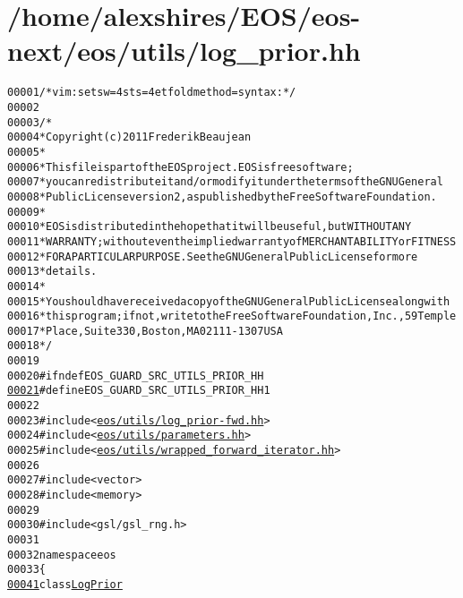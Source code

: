 \hypertarget{log__prior_8hh_source}{
\section{/home/alexshires/EOS/eos-\/next/eos/utils/log\_\-prior.hh}
}


\begin{footnotesize}\begin{alltt}
00001 \textcolor{comment}{/* vim: set sw=4 sts=4 et foldmethod=syntax : */}
00002 
00003 \textcolor{comment}{/*}
00004 \textcolor{comment}{ * Copyright (c) 2011 Frederik Beaujean}
00005 \textcolor{comment}{ *}
00006 \textcolor{comment}{ * This file is part of the EOS project. EOS is free software;}
00007 \textcolor{comment}{ * you can redistribute it and/or modify it under the terms of the GNU General}
00008 \textcolor{comment}{ * Public License version 2, as published by the Free Software Foundation.}
00009 \textcolor{comment}{ *}
00010 \textcolor{comment}{ * EOS is distributed in the hope that it will be useful, but WITHOUT ANY}
00011 \textcolor{comment}{ * WARRANTY; without even the implied warranty of MERCHANTABILITY or FITNESS}
00012 \textcolor{comment}{ * FOR A PARTICULAR PURPOSE.  See the GNU General Public License for more}
00013 \textcolor{comment}{ * details.}
00014 \textcolor{comment}{ *}
00015 \textcolor{comment}{ * You should have received a copy of the GNU General Public License along with}
00016 \textcolor{comment}{ * this program; if not, write to the Free Software Foundation, Inc., 59 Temple}
00017 \textcolor{comment}{ * Place, Suite 330, Boston, MA  02111-1307  USA}
00018 \textcolor{comment}{ */}
00019 
00020 \textcolor{preprocessor}{#ifndef EOS\_GUARD\_SRC\_UTILS\_PRIOR\_HH}
\hypertarget{log__prior_8hh_source_l00021}{}\hyperlink{log__prior_8hh_ab7e0d02ec792882216ba5142846fb302}{00021} \textcolor{preprocessor}{}\textcolor{preprocessor}{#define EOS\_GUARD\_SRC\_UTILS\_PRIOR\_HH 1}
00022 \textcolor{preprocessor}{}
00023 \textcolor{preprocessor}{#include <\hyperlink{log__prior-fwd_8hh}{eos/utils/log_prior-fwd.hh}>}
00024 \textcolor{preprocessor}{#include <\hyperlink{parameters_8hh}{eos/utils/parameters.hh}>}
00025 \textcolor{preprocessor}{#include <\hyperlink{wrapped__forward__iterator_8hh}{eos/utils/wrapped_forward_iterator.hh}>}
00026 
00027 \textcolor{preprocessor}{#include <vector>}
00028 \textcolor{preprocessor}{#include <memory>}
00029 
00030 \textcolor{preprocessor}{#include  <gsl/gsl\_rng.h>}
00031 
00032 \textcolor{keyword}{namespace }eos
00033 \{
\hypertarget{log__prior_8hh_source_l00041}{}\hyperlink{classeos_1_1LogPrior}{00041}     \textcolor{keyword}{class }\hyperlink{classeos_1_1LogPrior}{LogPrior}

\end{alltt}
\end{footnotesize}

